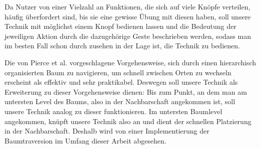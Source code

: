 Da Nutzer von einer Vielzahl an Funktionen, die sich auf viele Knöpfe verteilen, häufig überfordert sind, bis sie eine gewisse Übung mit diesen haben, soll unsere Technik mit möglichst einem Knopf bedienen lassen und die Bedeutung der jeweiligen Aktion durch die dazugehörige Geste beschrieben werden, sodass man im besten Fall schon durch zusehen in der Lage ist, die Technik zu bedienen.

Die von Pierce et al. \cite{pierce_representations} vorgeschlagene Vorgehensweise, sich durch einen hierarchisch organisierten Baum zu navigieren, um schnell zwischen Orten zu wechseln erscheint als effektiv und sehr praktikabel. Deswegen soll unsere Technik als Erweiterung zu dieser Vorgehensweise dienen: Bis zum Punkt, an dem man am untersten Level des Baums, also in der Nachbarschaft angekommen ist, soll unsere Technik analog zu dieser funktionieren. Im untersten Baumlevel angekommen, knüpft unsere Technik also an und dient der schnellen Platzierung in der Nachbarschaft. Deshalb wird von einer Implementierung der Baumtraversion im Umfang dieser Arbeit abgesehen.